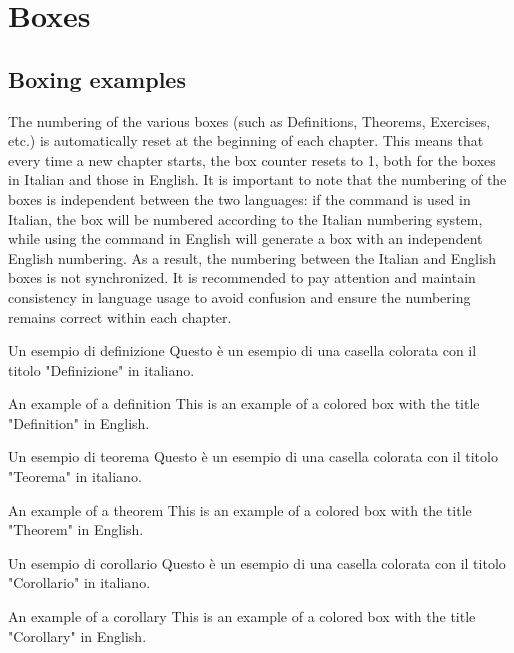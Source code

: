 \chapter{Boxes}
\section{Boxing examples}

The numbering of the various boxes (such as Definitions, Theorems, Exercises, etc.) is automatically reset at the beginning of each chapter. This means that every time a new chapter starts, the box counter resets to 1, both for the boxes in Italian and those in English. It is important to note that the numbering of the boxes is independent between the two languages: if the command is used in Italian, the box will be numbered according to the Italian numbering system, while using the command in English will generate a box with an independent English numbering. As a result, the numbering between the Italian and English boxes is not synchronized. It is recommended to pay attention and maintain consistency in language usage to avoid confusion and ensure the numbering remains correct within each chapter.

\begin{definizione}{Un esempio di definizione}
  Questo è un esempio di una casella colorata con il titolo "Definizione" in italiano.
\end{definizione}

\begin{definition}{An example of a definition}
  This is an example of a colored box with the title "Definition" in English.
\end{definition}

\begin{teorema}{Un esempio di teorema}
  Questo è un esempio di una casella colorata con il titolo "Teorema" in italiano.
\end{teorema}

\begin{theorem}{An example of a theorem}
  This is an example of a colored box with the title "Theorem" in English.
\end{theorem}

\begin{corollario}{Un esempio di corollario}
  Questo è un esempio di una casella colorata con il titolo "Corollario" in italiano.
\end{corollario}

\begin{corollary}{An example of a corollary}
  This is an example of a colored box with the title "Corollary" in English.
\end{corollary}

